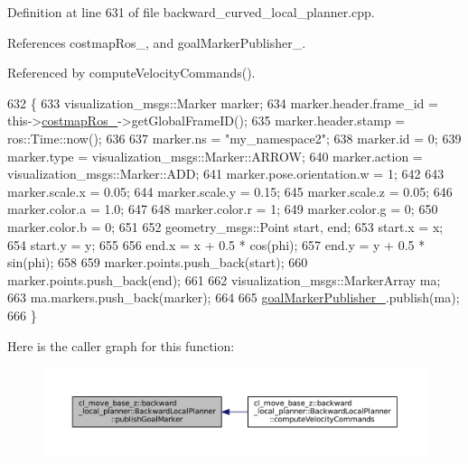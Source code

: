 Definition at line 631 of file backward\+\_\+curved\+\_\+local\+\_\+planner.\+cpp.



References costmap\+Ros\+\_\+, and goal\+Marker\+Publisher\+\_\+.



Referenced by compute\+Velocity\+Commands().


\begin{DoxyCode}
632         \{
633             visualization\_msgs::Marker marker;
634             marker.header.frame\_id = this->\hyperlink{classcl__move__base__z_1_1backward__local__planner_1_1BackwardLocalPlanner_a4136268882a105d9e06e173d85d5c0dc}{costmapRos\_}->getGlobalFrameID();
635             marker.header.stamp = ros::Time::now();
636 
637             marker.ns = \textcolor{stringliteral}{"my\_namespace2"};
638             marker.id = 0;
639             marker.type = visualization\_msgs::Marker::ARROW;
640             marker.action = visualization\_msgs::Marker::ADD;
641             marker.pose.orientation.w = 1;
642 
643             marker.scale.x = 0.05;
644             marker.scale.y = 0.15;
645             marker.scale.z = 0.05;
646             marker.color.a = 1.0;
647 
648             marker.color.r = 1;
649             marker.color.g = 0;
650             marker.color.b = 0;
651 
652             geometry\_msgs::Point start, end;
653             start.x = x;
654             start.y = y;
655 
656             end.x = x + 0.5 * cos(phi);
657             end.y = y + 0.5 * sin(phi);
658 
659             marker.points.push\_back(start);
660             marker.points.push\_back(end);
661 
662             visualization\_msgs::MarkerArray ma;
663             ma.markers.push\_back(marker);
664 
665             \hyperlink{classcl__move__base__z_1_1backward__local__planner_1_1BackwardLocalPlanner_a79f0ddfa686e2cd47bbc2f0bac9f3d4c}{goalMarkerPublisher\_}.publish(ma);
666         \}
\end{DoxyCode}
Here is the caller graph for this function\+:
\nopagebreak
\begin{figure}[H]
\begin{center}
\leavevmode
\includegraphics[width=350pt]{classcl__move__base__z_1_1backward__local__planner_1_1BackwardLocalPlanner_a70eaeb6cf31fd3378d9fbf9bcb975995_icgraph}
\end{center}
\end{figure}
